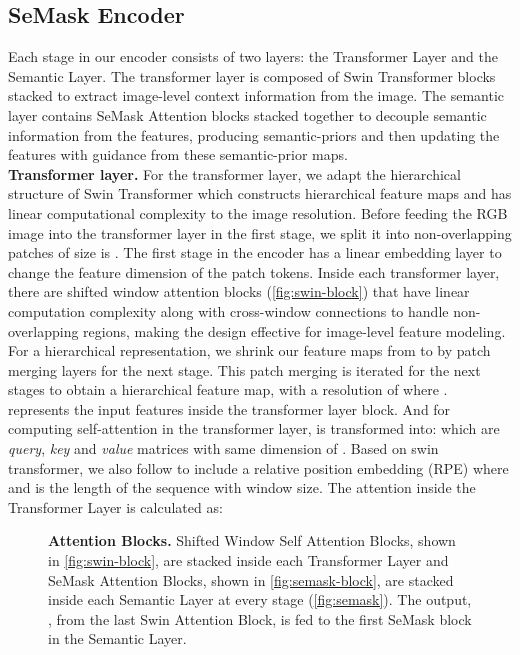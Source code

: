 \documentclass[10pt,twocolumn,letterpaper]{article}
\begin{document}
\subsection{SeMask Encoder}
Each stage in our encoder consists of two layers: the Transformer Layer and the Semantic Layer. The transformer layer is composed of  Swin Transformer blocks stacked to extract image-level context information from the image. The semantic layer contains  SeMask Attention blocks stacked together to decouple semantic information from the features, producing semantic-priors and then updating the features with guidance from these semantic-prior maps. \\
\textbf{Transformer layer.} For the transformer layer, we adapt the hierarchical structure of Swin Transformer \cite{swin-T} which constructs hierarchical feature maps and has linear computational complexity to the image resolution.
Before feeding the RGB image into the transformer layer in the first stage, we split it into non-overlapping patches of size is . 
The first stage in the encoder has a linear embedding layer to change the feature dimension of the patch tokens. Inside each transformer layer, there are  shifted window attention blocks (\cref{fig:swin-block}) that have linear computation complexity along with cross-window connections to handle non-overlapping regions, making the design effective for image-level feature modeling. For a hierarchical representation, we shrink our feature maps from  to  by patch merging layers for the next stage. This patch merging is iterated for the next stages to obtain a hierarchical feature map, with a  resolution of  where .  represents the input features inside the transformer layer block. And for computing self-attention in the transformer layer,  is transformed into:  which are \emph{query}, \emph{key} and \emph{value} matrices with same dimension of . Based on swin transformer, we also follow \cite{unilmv2, relation-net, local-relation-net, jmlr, swin-T} to include a relative position embedding (RPE) where  and  is the length of the sequence with  window size. The attention inside the Transformer Layer is calculated as:


\begin{figure}[ht!]
\centering
{}
	

\caption{\textbf{Attention Blocks.}  Shifted Window Self Attention Blocks, shown in \cref{fig:swin-block}, are stacked inside each Transformer Layer and  SeMask Attention Blocks, shown in \cref{fig:semask-block}, are stacked inside each Semantic Layer at every stage (\cref{fig:semask}). The output, , from the last Swin Attention Block, is fed to the first SeMask block in the Semantic Layer.}
\label{fig:attn-block}
\end{figure}
\end{document}
